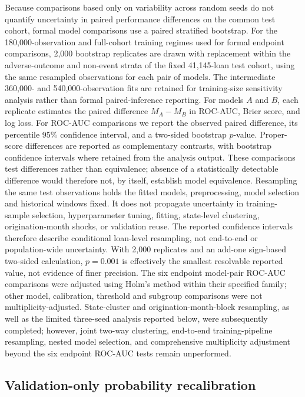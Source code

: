 \documentclass[10pt]{article}
\begin{document}
Because comparisons based only on variability across random seeds do not quantify uncertainty in paired performance differences on the common test cohort, formal model comparisons use a paired stratified bootstrap. For the 180,000-observation and full-cohort training regimes used for formal endpoint comparisons, 2,000 bootstrap replicates are drawn with replacement within the adverse-outcome and non-event strata of the fixed 41,145-loan test cohort, using the same resampled observations for each pair of models. The intermediate 360,000- and 540,000-observation fits are retained for training-size sensitivity analysis rather than formal paired-inference reporting. For models $A$ and $B$, each replicate estimates the paired difference $M_A-M_B$ in ROC-AUC, Brier score, and log loss. For ROC-AUC comparisons we report the observed paired difference, its percentile 95\% confidence interval, and a two-sided bootstrap $p$-value. Proper-score differences are reported as complementary contrasts, with bootstrap confidence intervals where retained from the analysis output. These comparisons test differences rather than equivalence; absence of a statistically detectable difference would therefore not, by itself, establish model equivalence. Resampling the same test observations holds the fitted models, preprocessing, model selection and historical windows fixed. It does not propagate uncertainty in training-sample selection, hyperparameter tuning, fitting, state-level clustering, origination-month shocks, or validation reuse. The reported confidence intervals therefore describe conditional loan-level resampling, not end-to-end or population-wide uncertainty. With 2,000 replicates and an add-one sign-based two-sided calculation, \(p=0.001\) is effectively the smallest resolvable reported value, not evidence of finer precision. The six endpoint model-pair ROC-AUC comparisons were adjusted using Holm's method within their specified family; other model, calibration, threshold and subgroup comparisons were not multiplicity-adjusted. State-cluster and origination-month-block resampling, as well as the limited three-seed analysis reported below, were subsequently completed; however, joint two-way clustering, end-to-end training-pipeline resampling, nested model selection, and comprehensive multiplicity adjustment beyond the six endpoint ROC-AUC tests remain unperformed.


\subsection{Validation-only probability recalibration}
\end{document}
